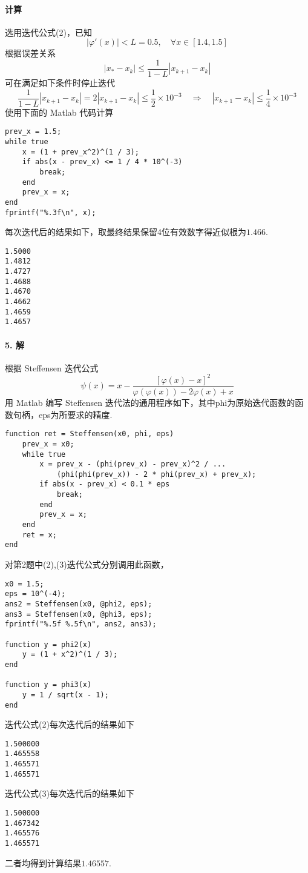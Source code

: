 \paragraph{计算} 选用迭代公式(2)，已知
\[|\varphi'(x)| < L = 0.5, \quad \forall x \in [1.4, 1.5]\]
根据误差关系
\[|x_* - x_k| \le \frac{1}{1 - L} |x_{k + 1} - x_k|\]
可在满足如下条件时停止迭代
\[\frac{1}{1 - L} |x_{k + 1} - x_k| = 2|x_{k + 1} - x_k| \le \frac{1}{2} \times 10^{-3} \quad \Rightarrow \quad |x_{k + 1} - x_k| \le \frac{1}{4} \times 10^{-3}\]
使用下面的 Matlab 代码计算
\begin{lstlisting}
prev_x = 1.5;
while true
    x = (1 + prev_x^2)^(1 / 3);
    if abs(x - prev_x) <= 1 / 4 * 10^(-3)
        break;
    end
    prev_x = x;
end
fprintf("%.3f\n", x);
\end{lstlisting}
每次迭代后的结果如下，取最终结果保留4位有效数字得近似根为$1.466$.
\begin{lstlisting}
1.5000
1.4812
1.4727
1.4688
1.4670
1.4662
1.4659
1.4657
\end{lstlisting}

\paragraph{5. 解}

根据 Steffensen 迭代公式
\[\psi(x) = x - \frac{[\varphi(x) - x]^2}{\varphi(\varphi(x)) - 2\varphi(x) + x}\]
用 Matlab 编写 Steffensen 迭代法的通用程序如下，其中phi为原始迭代函数的函数句柄，eps为所要求的精度.
\begin{lstlisting}
function ret = Steffensen(x0, phi, eps)
    prev_x = x0;
    while true
        x = prev_x - (phi(prev_x) - prev_x)^2 / ...
            (phi(phi(prev_x)) - 2 * phi(prev_x) + prev_x);
        if abs(x - prev_x) < 0.1 * eps
            break;
        end
        prev_x = x;
    end
    ret = x;
end
\end{lstlisting}
对第2题中(2),(3)迭代公式分别调用此函数，
\begin{lstlisting}
x0 = 1.5;
eps = 10^(-4);
ans2 = Steffensen(x0, @phi2, eps);
ans3 = Steffensen(x0, @phi3, eps);
fprintf("%.5f %.5f\n", ans2, ans3);

function y = phi2(x)
    y = (1 + x^2)^(1 / 3);
end

function y = phi3(x)
    y = 1 / sqrt(x - 1);
end
\end{lstlisting}
迭代公式(2)每次迭代后的结果如下
\begin{lstlisting}
1.500000
1.465558
1.465571
1.465571
\end{lstlisting}
迭代公式(3)每次迭代后的结果如下
\begin{lstlisting}
1.500000
1.467342
1.465576
1.465571
\end{lstlisting}
二者均得到计算结果$1.46557$.

